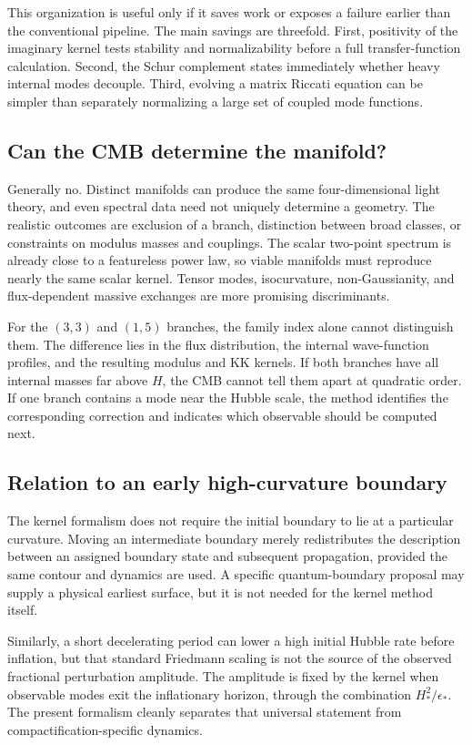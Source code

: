 \documentclass[aps,prd,twocolumn,superscriptaddress,nofootinbib,longbibliography]{revtex4-2}
\begin{document}
This organization is useful only if it saves work or exposes a failure earlier than the conventional pipeline. The main savings are threefold. First, positivity of the imaginary kernel tests stability and normalizability before a full transfer-function calculation. Second, the Schur complement states immediately whether heavy internal modes decouple. Third, evolving a matrix Riccati equation can be simpler than separately normalizing a large set of coupled mode functions.

\subsection{Can the CMB determine the manifold?}
Generally no. Distinct manifolds can produce the same four-dimensional light theory, and even spectral data need not uniquely determine a geometry. The realistic outcomes are exclusion of a branch, distinction between broad classes, or constraints on modulus masses and couplings. The scalar two-point spectrum is already close to a featureless power law, so viable manifolds must reproduce nearly the same scalar kernel. Tensor modes, isocurvature, non-Gaussianity, and flux-dependent massive exchanges are more promising discriminants.

For the $(3,3)$ and $(1,5)$ branches, the family index alone cannot distinguish them. The difference lies in the flux distribution, the internal wave-function profiles, and the resulting modulus and KK kernels. If both branches have all internal masses far above $H$, the CMB cannot tell them apart at quadratic order. If one branch contains a mode near the Hubble scale, the method identifies the corresponding correction and indicates which observable should be computed next.

\subsection{Relation to an early high-curvature boundary}
The kernel formalism does not require the initial boundary to lie at a particular curvature. Moving an intermediate boundary merely redistributes the description between an assigned boundary state and subsequent propagation, provided the same contour and dynamics are used. A specific quantum-boundary proposal may supply a physical earliest surface, but it is not needed for the kernel method itself.

Similarly, a short decelerating period can lower a high initial Hubble rate before inflation, but that standard Friedmann scaling is not the source of the observed fractional perturbation amplitude. The amplitude is fixed by the kernel when observable modes exit the inflationary horizon, through the combination $H_*^2/\epsilon_*$. The present formalism cleanly separates that universal statement from compactification-specific dynamics.
\end{document}
